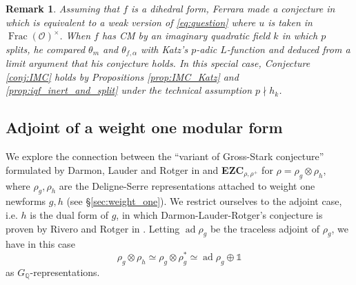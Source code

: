 \documentclass[12pt]{amsart}
\newcommand\bQ{\mathbb{Q}}
\newcommand\cO{\mathcal{O}}
\renewcommand{\char}{\textrm{char}}
\DeclareMathOperator{\Frac}{Frac}
\DeclareMathOperator{\ad}{ad}
\theoremstyle{defstyle}
\newtheorem{remark}[subsubsection]{Remark}
\theoremstyle{thmstyle}
\begin{document}
\begin{remark}
	Assuming that $f$ is a dihedral form, Ferrara made a conjecture in \cite{ferraraarticle} which is equivalent to a weak version of \eqref{eq:question} where $u$ is taken in $\Frac(\cO)^\times$. When $f$ has CM by an imaginary quadratic field $k$ in which $p$ splits, he compared $\theta_m$ and $\theta_{f,\alpha}$ with Katz's $p$-adic $L$-function and deduced from a limit argument that his conjecture holds. In this special case, Conjecture \ref{conj:IMC} holds by Propositions \ref{prop:IMC_Katz} and \ref{prop:iqf_inert_and_split} under the technical assumption $p\nmid h_k$.
\end{remark}

\subsection{Adjoint of a weight one modular form}\label{sec:examples_adjoint}
We explore the connection between the ``variant of Gross-Stark conjecture'' formulated by Darmon, Lauder and Rotger in \cite{DLR2} and \textbf{EZC}$_{\rho,\rho^+}$ for $\rho=\rho_g\otimes \rho_h$, where $\rho_g,\rho_h$ are the Deligne-Serre representations attached to weight one newforms $g,h$ (see \S\ref{sec:weight_one}). We restrict ourselves to the adjoint case, i.e. $h$ is the dual form of $g$, in which Darmon-Lauder-Rotger's conjecture is proven by Rivero and Rotger in \cite{riveroadjoint}.  Letting $\ad \rho_g$ be the traceless adjoint of $\rho_g$, we have in this case
\[\rho_g \otimes \rho_h \simeq \rho_g \otimes \rho_g^* \simeq \ad \rho_g \oplus \mathds{1}\]
as $G_{\bQ}$-representations.
\end{document}

